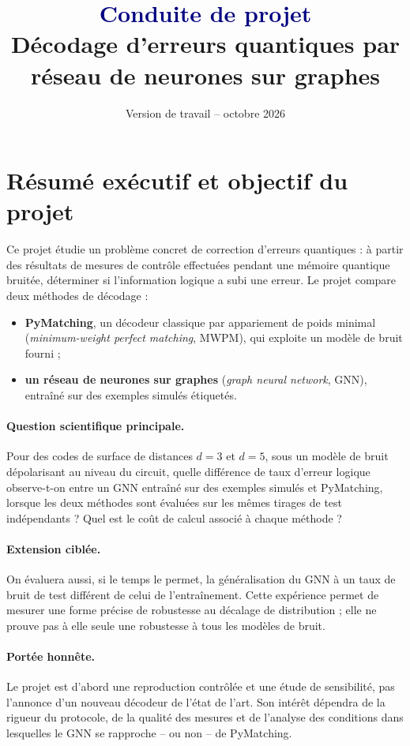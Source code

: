 \documentclass[11pt,a4paper]{article}
\title{\textcolor{navy}{Conduite de projet}\\[0.4em]
\Large Décodage d'erreurs quantiques par réseau de neurones sur graphes}
\author{}
\date{Version de travail -- octobre 2026}
\begin{document}
\maketitle
\tableofcontents
\newpage

\section{Résumé exécutif et objectif du projet}

Ce projet étudie un problème concret de correction d'erreurs quantiques :
à partir des résultats de mesures de contrôle effectuées pendant une
mémoire quantique bruitée, déterminer si l'information logique a subi une
erreur. Le projet compare deux méthodes de décodage :
\begin{itemize}
  \item \textbf{PyMatching}, un décodeur classique par appariement de poids
  minimal (\emph{minimum-weight perfect matching}, MWPM), qui exploite un
  modèle de bruit fourni ;
  \item \textbf{un réseau de neurones sur graphes} (\emph{graph neural
  network}, GNN), entraîné sur des exemples simulés étiquetés.
\end{itemize}

\paragraph{Question scientifique principale.}
Pour des codes de surface de distances $d=3$ et $d=5$, sous un modèle de
bruit dépolarisant au niveau du circuit, quelle différence de taux d'erreur
logique observe-t-on entre un GNN entraîné sur des exemples simulés et
PyMatching, lorsque les deux méthodes sont évaluées sur les mêmes tirages
de test indépendants ? Quel est le coût de calcul associé à chaque méthode ?

\paragraph{Extension ciblée.}
On évaluera aussi, si le temps le permet, la généralisation du GNN à un taux
de bruit de test différent de celui de l'entraînement. Cette expérience
permet de mesurer une forme précise de robustesse au décalage de distribution ;
elle ne prouve pas à elle seule une robustesse à tous les modèles de bruit.

\paragraph{Portée honnête.}
Le projet est d'abord une reproduction contrôlée et une étude de sensibilité,
pas l'annonce d'un nouveau décodeur de l'état de l'art. Son intérêt dépendra
de la rigueur du protocole, de la qualité des mesures et de l'analyse des
conditions dans lesquelles le GNN se rapproche -- ou non -- de PyMatching.
\end{document}
